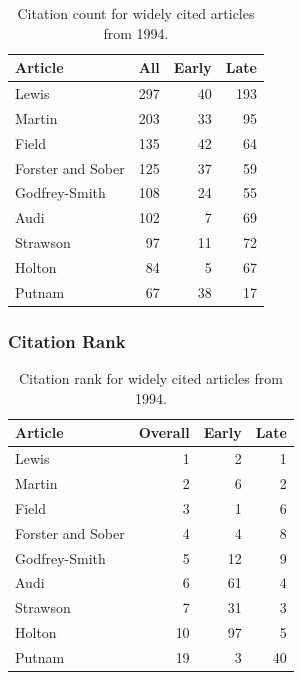\documentclass[
  10pt,
  letterpaper,
  DIV=11,
  numbers=noendperiod,
  twoside]{scrartcl}
\begin{document}
\begin{longtable}[]{@{}lrrr@{}}

\caption{\label{tbl-citation-count-1994}Citation count for widely cited
articles from 1994.}

\tabularnewline

\toprule\noalign{}
Article & All & Early & Late \\
\midrule\noalign{}
\endhead
\bottomrule\noalign{}
\endlastfoot
Lewis & 297 & 40 & 193 \\
Martin & 203 & 33 & 95 \\
Field & 135 & 42 & 64 \\
Forster and Sober & 125 & 37 & 59 \\
Godfrey-Smith & 108 & 24 & 55 \\
Audi & 102 & 7 & 69 \\
Strawson & 97 & 11 & 72 \\
Holton & 84 & 5 & 67 \\
Putnam & 67 & 38 & 17 \\

\end{longtable}

\subsubsection*{Citation Rank}\label{citation-rank-18}

\begin{longtable}[]{@{}lrrr@{}}

\caption{\label{tbl-citation-rank-1994}Citation rank for widely cited
articles from 1994.}

\tabularnewline

\toprule\noalign{}
Article & Overall & Early & Late \\
\midrule\noalign{}
\endhead
\bottomrule\noalign{}
\endlastfoot
Lewis & 1 & 2 & 1 \\
Martin & 2 & 6 & 2 \\
Field & 3 & 1 & 6 \\
Forster and Sober & 4 & 4 & 8 \\
Godfrey-Smith & 5 & 12 & 9 \\
Audi & 6 & 61 & 4 \\
Strawson & 7 & 31 & 3 \\
Holton & 10 & 97 & 5 \\
Putnam & 19 & 3 & 40 \\

\end{longtable}
\end{document}
